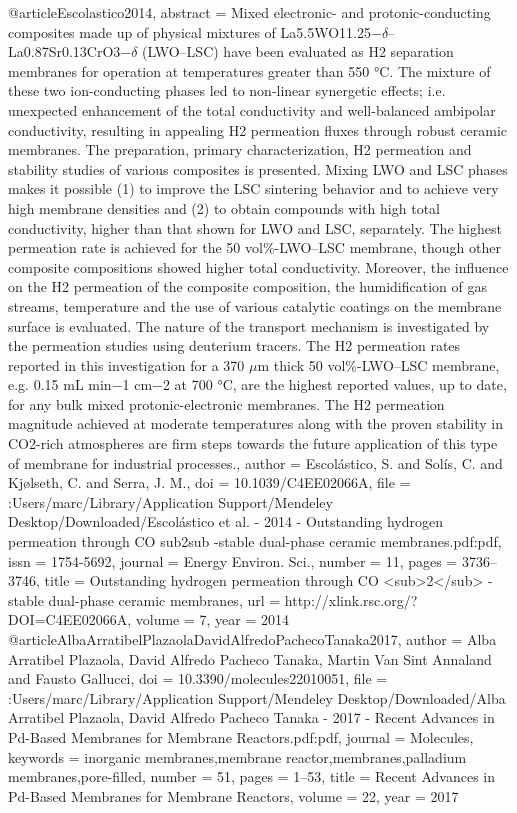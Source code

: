 @article{Escolastico2014,
abstract = {Mixed electronic- and protonic-conducting composites made up of physical mixtures of La5.5WO11.25−$\delta$–La0.87Sr0.13CrO3−$\delta$ (LWO–LSC) have been evaluated as H2 separation membranes for operation at temperatures greater than 550 °C. The mixture of these two ion-conducting phases led to non-linear synergetic effects; i.e. unexpected enhancement of the total conductivity and well-balanced ambipolar conductivity, resulting in appealing H2 permeation fluxes through robust ceramic membranes. The preparation, primary characterization, H2 permeation and stability studies of various composites is presented. Mixing LWO and LSC phases makes it possible (1) to improve the LSC sintering behavior and to achieve very high membrane densities and (2) to obtain compounds with high total conductivity, higher than that shown for LWO and LSC, separately. The highest permeation rate is achieved for the 50 vol{\%}-LWO–LSC membrane, though other composite compositions showed higher total conductivity. Moreover, the influence on the H2 permeation of the composite composition, the humidification of gas streams, temperature and the use of various catalytic coatings on the membrane surface is evaluated. The nature of the transport mechanism is investigated by the permeation studies using deuterium tracers. The H2 permeation rates reported in this investigation for a 370 $\mu$m thick 50 vol{\%}-LWO–LSC membrane, e.g. 0.15 mL min−1 cm−2 at 700 °C, are the highest reported values, up to date, for any bulk mixed protonic-electronic membranes. The H2 permeation magnitude achieved at moderate temperatures along with the proven stability in CO2-rich atmospheres are firm steps towards the future application of this type of membrane for industrial processes.},
author = {Escol{\'{a}}stico, S. and Sol{\'{i}}s, C. and Kj{\o}lseth, C. and Serra, J. M.},
doi = {10.1039/C4EE02066A},
file = {:Users/marc/Library/Application Support/Mendeley Desktop/Downloaded/Escol{\'{a}}stico et al. - 2014 - Outstanding hydrogen permeation through CO sub2sub -stable dual-phase ceramic membranes.pdf:pdf},
issn = {1754-5692},
journal = {Energy Environ. Sci.},
number = {11},
pages = {3736--3746},
title = {{Outstanding hydrogen permeation through CO {\textless}sub{\textgreater}2{\textless}/sub{\textgreater} -stable dual-phase ceramic membranes}},
url = {http://xlink.rsc.org/?DOI=C4EE02066A},
volume = {7},
year = {2014}
}
@article{AlbaArratibelPlazaolaDavidAlfredoPachecoTanaka2017,
author = {{Alba Arratibel Plazaola, David Alfredo Pacheco Tanaka}, Martin Van Sint Annaland and Fausto Gallucci},
doi = {10.3390/molecules22010051},
file = {:Users/marc/Library/Application Support/Mendeley Desktop/Downloaded/Alba Arratibel Plazaola, David Alfredo Pacheco Tanaka - 2017 - Recent Advances in Pd-Based Membranes for Membrane Reactors.pdf:pdf},
journal = {Molecules},
keywords = {inorganic membranes,membrane reactor,membranes,palladium membranes,pore-filled},
number = {51},
pages = {1--53},
title = {{Recent Advances in Pd-Based Membranes for Membrane Reactors}},
volume = {22},
year = {2017}
}
